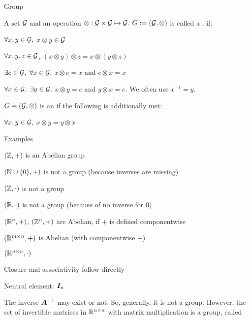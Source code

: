\documentclass[handout,fleqn,aspectratio=169]{beamer}
\begin{document}
\begin{frame}{Group} 

\plitemsep 0.1in

\bci
\item A set $\mathcal G$ and an operation $\otimes: \mathcal G \times \mathcal G \mapsto \mathcal G.$ $G := (\mathcal G,\otimes)$ is called a , if:

\bce
\item {} $\forall x,y \in \mathcal G,$ $x \otimes y \in \mathcal G$
\item {} $\forall x,y,z \in \mathcal G$, $(x \otimes y) \otimes z = x \otimes (y \otimes z)$
\item {} $\exists e \in \mathcal G,$ $\forall x \in \mathcal G,$ $x \otimes e = x$ and $e \otimes x = x$
\item {} $\forall x \in \mathcal G,$ $\exists y \in \mathcal G,$  $x \otimes y = e$ and $y \otimes x = e.$ We often use $x^{-1} =y.$
\ece

\vspace{1cm}

\item $G = (\mathcal G,\otimes)$ is an  if the following is additionally met:
\bci
\item {} $\forall x,y \in \mathcal G,$ $x \otimes y = y \otimes x$
\eci
\eci
\end{frame}

\begin{frame}{Examples} 

\plitemsep 0.05in

\bci
\item $({\mathbb Z},+)$ is an Abelian group
\item $({\mathbb N} \cup \{ 0\}, +)$ is not a group (because inverses are missing)
\item $({\mathbb Z},\cdot)$ is not a group
\item $({\mathbb R},\cdot)$ is not a group (because of no inverse for 0)
\item $({\mathbb R}^n,+)$, $({\mathbb Z}^n,+)$ are Abelian, if $+$ is defined componentwise

\item $({\mathbb R}^{m \times n},+)$ is Abelian (with componentwise $+$)
\item $({\mathbb R}^{n \times n},\cdot)$
\bci
\item Closure and associativity follow directly 
\item Neutral element: $\bm{I}_n$
\item The inverse ${\bm{A}}^{-1}$ may exist or not. So, generally, it is not a group. 
However, the set of invertible matrices in ${\mathbb R}^{n \times n}$ with matrix multiplication  is a group, called 

\eci
\eci
\end{frame}
\end{document}
